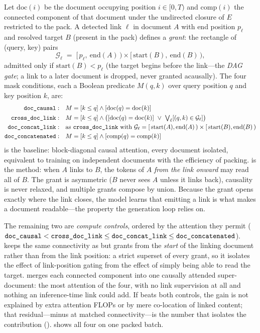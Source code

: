 Let $\mathrm{doc}(i)$ be the document occupying position $i\in[0,T)$ and
$\mathrm{comp}(i)$ the connected component of that document under the undirected
closure of $E$ restricted to the pack. A detected link $\ell$ in document $A$ with end
position $p_\ell$ and resolved target $B$ (present in the pack) defines a
\emph{grant}: the rectangle of (query, key) pairs
\[
  \mathcal{G}_\ell \;=\; [\,p_\ell,\ \mathrm{end}(A)\,)\times[\,\mathrm{start}(B),\ \mathrm{end}(B)\,),
\]
admitted only if $\mathrm{start}(B) < p_\ell$ (the target begins before the link---the
\emph{DAG gate}; a link to a later document is dropped, never granted acausally). The
four mask conditions, each a Boolean predicate $M(q,k)$ over query position $q$ and key
position $k$, are:
\begin{align}
  \doccausal:\quad  & M = [k\le q]\wedge[\mathrm{doc}(q)=\mathrm{doc}(k)] \\
  \crossdoc:\quad   & M = [k\le q]\wedge\bigl([\mathrm{doc}(q)=\mathrm{doc}(k)]\ \vee\ \textstyle\bigvee_{\ell}[(q,k)\in\mathcal{G}_\ell]\bigr) \\
  \concatlink:\quad & \text{as \crossdoc with } \mathcal{G}_\ell = [\,\mathrm{start}(A),\mathrm{end}(A)\,)\times[\,\mathrm{start}(B),\mathrm{end}(B)\,) \\
  \concat:\quad     & M = [k\le q]\wedge[\mathrm{comp}(q)=\mathrm{comp}(k)]
\end{align}
\doccausal is the baseline: block-diagonal causal attention, every document isolated,
equivalent to training on independent documents with the efficiency of packing.
\crossdoc is the method: when $A$ links to $B$, the tokens of $A$ \emph{from the link
onward} may read all of $B$. The grant is asymmetric ($B$ never sees $A$ unless it links
back), causality is never relaxed, and multiple grants compose by union. Because the
grant opens exactly where the link closes, the model learns that emitting a link is
what makes a document readable---the property the generation loop relies on.

The remaining two are \emph{compute controls}, ordered by the attention they permit
($\texttt{doc\_causal} < \texttt{cross\_doc\_link} \le \texttt{doc\_concat\_link} \le \texttt{doc\_concatenated}$). \concatlink keeps the same
connectivity as \crossdoc but grants from the \emph{start} of the linking document
rather than from the link position: a strict superset of every \crossdoc grant, so it
isolates the effect of link-position gating from the effect of simply being able to
read the target. \concat merges each connected component into one causally attended
super-document: the most attention of the four, with no link supervision at all and
nothing an inference-time link could add. If \crossdoc beats both controls, the gain is
not explained by extra attention FLOPs or by mere co-location of linked content; that
residual---\crossdoc minus \concatlink at matched connectivity---is the number that
isolates the contribution ().  shows all four on one
packed batch.

